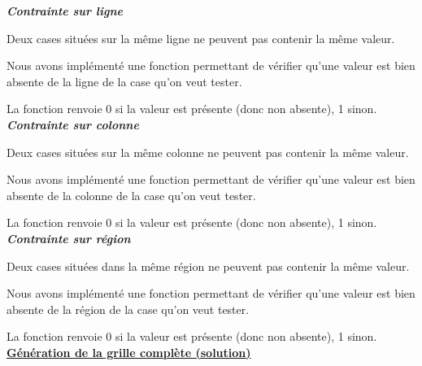 \documentclass[a4paper, 12pt]{article}
\begin{document}
\textit{\textbf{Contrainte sur ligne}}

	\par Deux cases situées sur la même ligne ne peuvent pas contenir la même valeur.
	\par Nous avons implémenté une fonction permettant de vérifier qu'une valeur est bien absente de la ligne de la case qu'on veut tester.
	\par La fonction renvoie 0 si la valeur est présente (donc non absente), 1 sinon.\\

\textit{\textbf{Contrainte sur colonne}}

	\par Deux cases situées sur la même colonne ne peuvent pas contenir la même valeur.
	\par Nous avons implémenté une fonction permettant de vérifier qu'une valeur est bien absente de la colonne de la case qu'on veut tester.
	\par La fonction renvoie 0 si la valeur est présente (donc non absente), 1 sinon.\\

\textit{\textbf{Contrainte sur région}}

	\par Deux cases situées dans la même région ne peuvent pas contenir la même valeur.
	\par Nous avons implémenté une fonction permettant de vérifier qu'une valeur est bien absente de la région de la case qu'on veut tester.
	\par La fonction renvoie 0 si la valeur est présente (donc non absente), 1 sinon.\\

\underline{\textbf{Génération de la grille complète (solution)}}
\end{document}
